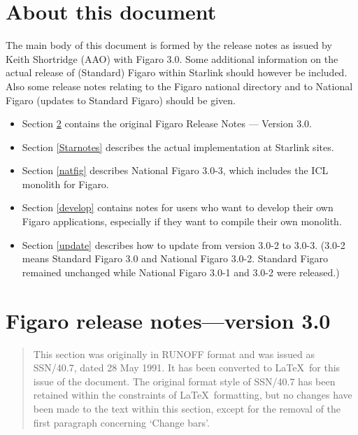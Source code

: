\newpage
\section{About this document}

The main body of this document is formed by the release notes as
issued by Keith Shortridge (AAO) with Figaro 3.0. Some additional
information on the actual release of (Standard) Figaro within Starlink
should however be included. Also some release notes relating to the
Figaro national directory and to National Figaro (updates to Standard
Figaro) should be given.

\begin{itemize}

\item Section \ref{AAOnotes} contains the original Figaro Release Notes ---
Version 3.0.

\item Section \ref{Starnotes} describes the actual implementation at Starlink
sites.

\item Section \ref{natfig} describes National Figaro 3.0-3, which includes the
ICL monolith for Figaro.

\item Section \ref{develop} contains notes for users who want to develop their
own Figaro applications, especially if they want to compile their own monolith.

\item Section \ref{update} describes how to update from version 3.0-2 to 3.0-3.
(3.0-2 means Standard Figaro 3.0 and National Figaro 3.0-2. Standard Figaro
remained unchanged while National Figaro 3.0-1 and 3.0-2 were released.)

\end{itemize}

\section{Figaro release notes---version 3.0}
\label{AAOnotes}

\begin{quote}\em

This section was originally in RUNOFF format and was issued as SSN/40.7,  dated
28 May 1991. It has been converted to \LaTeX\ for this issue of the document. 
The original format style of SSN/40.7 has been retained within the constraints
of \LaTeX\ formatting, but no changes have been made to the text within this
section, except for the removal of the first paragraph concerning `Change
bars'.

\end{quote}

